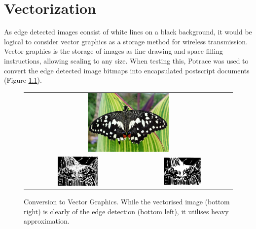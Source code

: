 \chapter{Vectorization}
\label{appendix:vectorization}

As edge detected images consist of white lines on a black background, it would be logical to consider vector graphics as a storage method for wireless transmission. Vector graphics is the storage of images as line drawing and space filling instructions, allowing scaling to any size. When testing this, Potrace \cite{potrace} was used to convert the edge detected image bitmaps into encapsulated postscript documents (Figure \ref{fig:potrace}). 

\begin{figure}[H]
    \begin{center}
    \begin{tabular}{ c c }
        \multicolumn{2}{c}{\includegraphics[width=0.4\textwidth]{Figures/butterfly.jpg}} \\
        \includegraphics[width=0.4\textwidth]{Figures/butteredge.jpg} &
        \includegraphics[width=0.4\textwidth]{Figures/butter.eps}
    \end{tabular}
    \caption[Conversion to Vector Graphics]{Conversion to Vector Graphics. While the vectorised image (bottom right) is clearly of the edge detection (bottom left), it utilises heavy approximation.}
    \label{fig:potrace}
    \end{center}
\end{figure}

